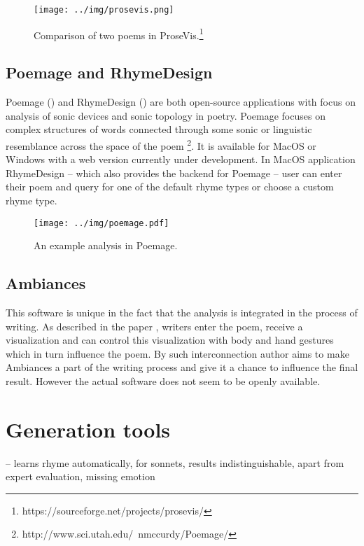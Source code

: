 \begin{figure}[h]\centering
	\texttt{[image: ../img/prosevis.png]}
	\caption{Comparison of two poems in ProseVis.\protect\footnote{https://sourceforge.net/projects/prosevis/}}\label{screenshotProsevis}
\end{figure}

\subsection{Poemage and RhymeDesign}
Poemage (\cite{McCurdy2015poemage}) and RhymeDesign (\cite{McCurdy2015}) are both open-source applications with focus on analysis of sonic devices and sonic topology in poetry. Poemage focuses on complex structures of words connected through some sonic or linguistic resemblance across the space of the poem \footnote{http://www.sci.utah.edu/~nmccurdy/Poemage/}. It is available for MacOS or Windows with a web version currently under development. In MacOS application RhymeDesign -- which also provides the backend for Poemage -- user can enter their poem and query for one of the default rhyme types or choose a custom rhyme type.

\begin{figure}[h]\centering
	\texttt{[image: ../img/poemage.pdf]}
	\caption{An example analysis in Poemage.}\label{screenshotPoemage}
\end{figure}

\subsection{Ambiances}
This software is unique in the fact that the analysis is integrated in the process of writing. As described in the paper \cite{Meneses2015}, writers enter the poem, receive a visualization and can control this visualization with body and hand gestures which in turn influence the poem. By such interconnection author aims to make Ambiances a part of the writing process and give it a chance to influence the final result. However the actual software does not seem to be openly available.


\section{Generation tools}
\cite{lau2018deep} -- learns rhyme automatically, for sonnets, results indistinguishable, apart from expert evaluation, missing emotion